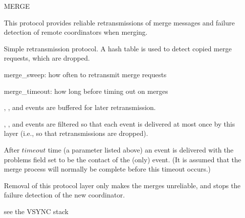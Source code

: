 \begin{Layer}{MERGE}

This protocol provides reliable retransmissions of merge messages and failure
detection of remote coordinators when merging.

\begin{Protocol}
Simple retransmission protocol.  A hash table is used to detect copied
merge requests, which are dropped.
\end{Protocol}

\begin{Parameters}
\item
merge\_sweep: how often to retransmit merge requests
\item
merge\_timeout: how long before timing out on merges
\end{Parameters}

\begin{Properties}
\item
{}, , and  events are
buffered for later retransmission.
\item
{}, , and  events are filtered
so that each event is delivered at most once by this layer (i.e., so that
retransmissions are dropped).
\item
After $timeout$ time (a parameter listed above) an  event is
delivered with the problems field set to be the contact of the 
(only) event.  (It is assumed that the merge process will normally be
complete before this timeout occurs.)
\end{Properties}

\begin{Notes}
\item
Removal of this protocol layer only makes the merges unreliable, and
stops the failure detection of the new coordinator.
\end{Notes}

\begin{Sources}
\end{Sources}

\begin{GenEvent}
\end{GenEvent}

\begin{Testing}
\item see the VSYNC stack
\end{Testing}
\end{Layer}
